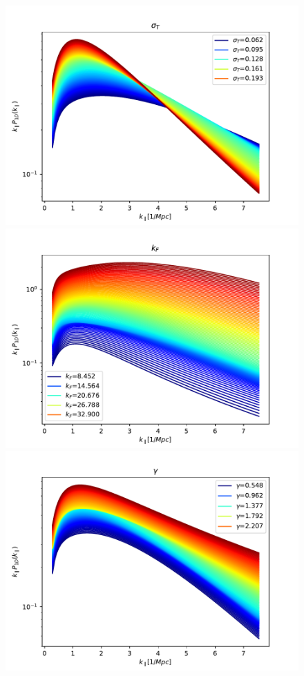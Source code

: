 \documentclass[]{article}
\begin{document}
\begin{figure}[h]
    \includegraphics[scale=0.47]{Figures/256_sigT_Mpc.pdf}
    \includegraphics[scale=0.47]{Figures/256_kF_Mpc.pdf}
    \includegraphics[scale=0.47]{Figures/256_gamma.pdf}

\end{figure}
\end{document}
